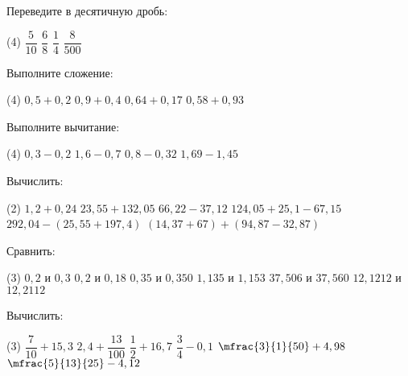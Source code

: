 \begin{homework}[number=2]
	\begin{listofex}
		\item Переведите в десятичную дробь:
		\begin{tasks}(4)
			\task \( \dfrac{5}{10} \)
			\task \( \dfrac{6}{8} \)
			\task \( \dfrac{1}{4} \)
			\task \( \dfrac{8}{500} \)
		\end{tasks}
		\item Выполните сложение:
		\begin{tasks}(4)
			\task \( 0,5+0,2 \)
			\task \( 0,9+0,4 \)
			\task \( 0,64+0,17 \)
			\task \( 0,58+0,93 \)
		\end{tasks}
		\item Выполните вычитание:
		\begin{tasks}(4)
			\task \( 0,3-0,2 \)
			\task \( 1,6-0,7 \)
			\task \( 0,8-0,32 \)
			\task \( 1,69-1,45 \)
		\end{tasks}
	\end{listofex}
\end{homework}


\begin{class}[number=3]
	\begin{listofex}
		\item Вычислить:
		\begin{tasks}(2)
			\task \( 1,2+0,24 \)
			\task \( 23,55+132,05 \)
			\task \( 66,22-37,12 \)
			\task \( 124,05+25,1-67,15 \)
			\task \( 292,04-(25,55+197,4) \)
			\task \( (14,37+67)+(94,87-32,87) \)
		\end{tasks}
		\item Сравнить:
		\begin{tasks}(3)
			\task \( 0,2 \) и \( 0,3 \)
			\task \( 0,2 \) и \( 0,18 \)
			\task \( 0,35 \) и \( 0,350 \)
			\task \( 1,135 \) и \( 1,153 \)
			\task \( 37,506 \) и \( 37,560 \)
			\task \( 12,1212 \) и \( 12,2112 \)
		\end{tasks}
		\item Вычислить:
		\begin{tasks}(3)
			\task \( \dfrac{7}{10}+15,3 \)
			\task \( 2,4+\dfrac{13}{100} \)
			\task \( \dfrac{1}{2}+16,7 \)
			\task \( \dfrac{3}{4}-0,1 \)
			\task \( \mfrac{3}{1}{50}+4,98 \)
			\task \( \mfrac{5}{13}{25}-4,12 \)
		\end{tasks}
	\end{listofex}
\end{class}
	
